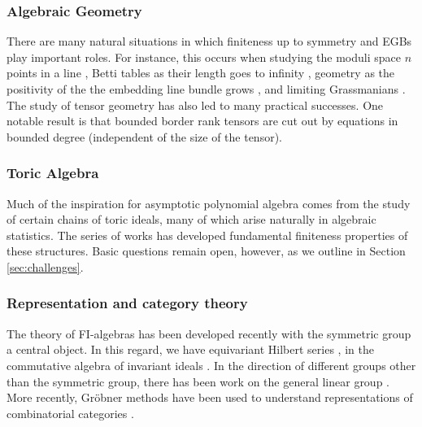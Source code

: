 \subsubsection{Algebraic Geometry}

There are many natural situations in which finiteness up to symmetry and EGBs play important roles.  For instance, this occurs when studying the moduli space $n$ points in a line \cite{howard2009equations}, Betti tables as their length goes to infinity \cite{ein2015asymptotics}, geometry as the positivity of the the embedding line bundle grows \cite{ein2012asymptotic}, and limiting Grassmanians \cite{draisma2015plucker}.  The study of tensor geometry has also led to many practical successes.  One notable result is that bounded border rank tensors are cut out by equations in bounded degree \cite{draisma2014bounded} (independent of the size of the tensor).

%

\subsubsection{Toric Algebra}

Much of the inspiration for asymptotic polynomial algebra comes from the study of certain chains of toric ideals, many of which arise naturally in algebraic statistics.  The series of works \cite{Hillar13, hillar2016corrigendum, draisma2013noetherianity, KKL:equivariant-markov} has developed fundamental finiteness properties of these structures.  Basic questions remain open, however, as we outline in Section \ref{sec:challenges}.

\subsubsection{Representation and category theory}

The theory of FI-algebras \cite{church2014fi, church2015fi} has been developed recently with the symmetric group a central object.  In this regard, we have equivariant Hilbert series \cite{Nagel}, \cite{krone2016hilbert} in the commutative algebra of invariant ideals \cite{hillar2012finite}. In the direction of different groups other than the symmetric group, there has been work on the general linear group \cite{putman2014representation, sam2016gl}.  More recently, Gr\"obner methods have been used to understand  representations of combinatorial categories \cite{sam2016grobner}.




